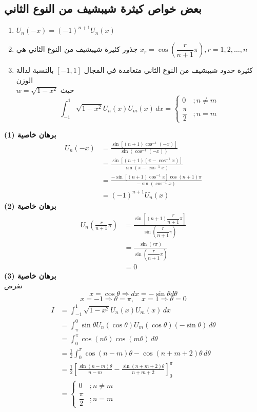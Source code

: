 \subsection*{بعض خواص كيثرة شيبشيف من النوع الثاني}
\begin{enumerate}
	\item $U_n(-x) = (-1)^{n+1} U_n(x)$
	\item جذور كثيرة شيبشيف من النوع الثاني هي \quad $x_r = \cos\left(\dfrac{r}{n+1}\pi\right), r=1,2,\dots,n$
	\item كثيرة حدود شيبشيف من النوع الثاني متعامدة في المجال $[-1,1]$ بالنسبة لدالة الوزن \\$w = \sqrt{1-x^2}$ حيث
	\[
	\int_{-1}^{1} \sqrt{1-x^2} U_n(x) U_m(x)\, dx = \begin{cases}
		0 & ;n\neq m \\
		\dfrac{\pi}{2} & ; n = m
	\end{cases}
	\]
\end{enumerate}
\textbf{برهان خاصية (1)}
\begin{align*}
	U_n(-x) &  = \frac{\sin[(n+1)\cos^{-1}(-x)]}{\sin(\cos^{-1}(-x))}\\[5pt]
	&= \frac{\sin[(n+1)(\pi-\cos^{-1}x)]}{\sin(\pi-\cos^{-1}x)}\\[5pt]
	&= \frac{-\sin[(n+1)\cos^{-1}x]\cos(n+1)\pi}{-\sin(\cos^{-1}x)}\\[5pt]
	&= (-1)^{n+1}U_n(x)
\end{align*}
\textbf{برهان خاصية (2)}
\begin{align*}
	U_n\left(\frac{r}{n+1}\pi\right) &= \frac{\sin\left[(n+1)\dfrac{r}{n+1}\pi\right]}{\sin\left(\dfrac{r}{n+1}\pi\right)}\\[5pt]
	&= \frac{\sin(r\pi)}{\sin\left(\dfrac{r}{n+1}\pi\right)}\\[5pt]
	&= 0
\end{align*}
\noindent
\textbf{برهان خاصية (3)}\\
\noindent
نفرض 
\[
x = \cos \theta \Rightarrow dx = -\sin \theta d\theta
\]
\[
x=-1 \Rightarrow \theta = \pi , \quad x=1 \Rightarrow \theta = 0
\]
\begin{align*}
	I &= \int_{-1}^{1} \sqrt{1-x^2} U_n(x) U_m(x) \, dx \\
	   &= \int_{\pi}^{0} \sin \theta U_n(\cos \theta) U_m(\cos \theta)  (-\sin\theta) \, d\theta\\
	   &= \int_{0}^{\pi} \cos(n\theta) \cos(m\theta) \, d\theta\\
	   &= \frac{1}{2}\int_{0}^{\pi} \cos(n-m)\theta - \cos(n+m+2)\theta \,d \theta\\
	   &= \frac{1}{2} \left[\frac{\sin(n-m)\theta}{n-m} - \frac{\sin(n+m+2)\theta}{n+m+2}\right]_0^{\pi}\\
	   &= \begin{cases}
	   	0 & ;n \neq m \\
	   	\dfrac{\pi}{2} & ; n = m
	   \end{cases}
\end{align*}



